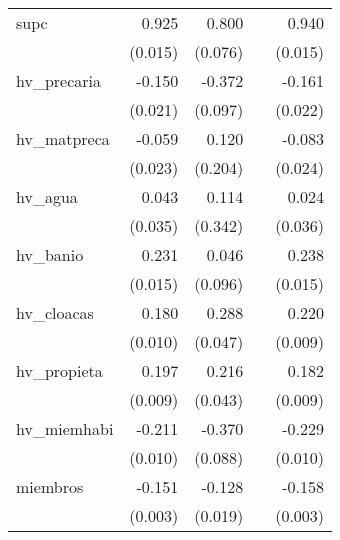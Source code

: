 {\begin{longtable}{l*{4}{D{.}{.}{-1}}}
\addlinespace
supc        &       0.925\sym{***}&       0.800\sym{***}&                     &       0.940\sym{***}\\
            &     (0.015)         &     (0.076)         &                     &     (0.015)         \\
\addlinespace
hv\_precaria &      -0.150\sym{***}&      -0.372\sym{***}&                     &      -0.161\sym{***}\\
            &     (0.021)         &     (0.097)         &                     &     (0.022)         \\
\addlinespace
hv\_matpreca &      -0.059\sym{*}  &       0.120         &                     &      -0.083\sym{***}\\
            &     (0.023)         &     (0.204)         &                     &     (0.024)         \\
\addlinespace
hv\_agua     &       0.043         &       0.114         &                     &       0.024         \\
            &     (0.035)         &     (0.342)         &                     &     (0.036)         \\
\addlinespace
hv\_banio    &       0.231\sym{***}&       0.046         &                     &       0.238\sym{***}\\
            &     (0.015)         &     (0.096)         &                     &     (0.015)         \\
\addlinespace
hv\_cloacas  &       0.180\sym{***}&       0.288\sym{***}&                     &       0.220\sym{***}\\
            &     (0.010)         &     (0.047)         &                     &     (0.009)         \\
\addlinespace
hv\_propieta &       0.197\sym{***}&       0.216\sym{***}&                     &       0.182\sym{***}\\
            &     (0.009)         &     (0.043)         &                     &     (0.009)         \\
\addlinespace
hv\_miemhabi &      -0.211\sym{***}&      -0.370\sym{***}&                     &      -0.229\sym{***}\\
            &     (0.010)         &     (0.088)         &                     &     (0.010)         \\
\addlinespace
miembros    &      -0.151\sym{***}&      -0.128\sym{***}&                     &      -0.158\sym{***}\\
            &     (0.003)         &     (0.019)         &                     &     (0.003)         \\

\end{longtable}}

